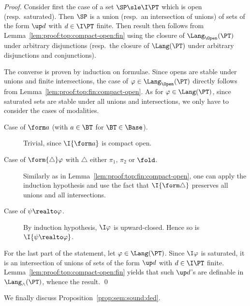 \begin{proof}
Consider first the case of a set $\SP \sle \I\PT$
which is open (resp.\ saturated).
Then $\SP$ is a union (resp.\ an intersection of unions) of
sets of the form $\up d$ with $d \in \I\PT$ finite.
Then result then follows from Lemma~\ref{lem:proof:top:compact-open:fin}
using the closure of $\Lang_\Open(\PT)$ under arbitrary disjunctions
(resp.\ the closure of $\Lang(\PT)$ under arbitrary disjunctions
and conjunctions).

The converse is proven by induction on formulae.
Since opens are stable under unions and finite intersections,
the case of $\varphi \in \Lang_\Open(\PT)$
directly follows from Lemma~\ref{lem:proof:top:fin:compact-open}.
As for $\varphi \in \Lang(\PT)$,
since saturated sets are stable under all unions and intersections,
we only have to consider the cases of modalities.
\begin{description}
\item[Case of $\form a$ (with $a \in \BT$ for $\BT \in \Base$).]
Trivial, since $\I{\form a}$ is compact open.

\item[Case of $\form{\triangle}\varphi$
with $\triangle$ either $\pi_1$, $\pi_2$ or $\fold$.]
Similarly as in Lemma~\ref{lem:proof:top:fin:compact-open},
one can apply the induction hypothesis and use the fact
that $\I{\form\triangle}$ preserves all unions and all intersections.

\item[Case of $\psi \realto \varphi$.]
By induction hypothesis, $\I\varphi$ is upward-closed.
Hence so is $\I{\psi \realto \varphi}$.
\end{description}

For the last part of the statement,
let $\varphi \in \Lang(\PT)$.
Since $\I\varphi$ is saturated,
it is an intersection of unions of sets
of the form $\up d$ with $d \in \I\PT$ finite.
Lemma~\ref{lem:proof:top:compact-open:fin} yields
that such $\up d$'s are definable in $\Lang_\land(\PT)$,
whence the result.
\qed
\end{proof}



We finally discuss Proposition~\ref{prop:sem:sound:ded}.


